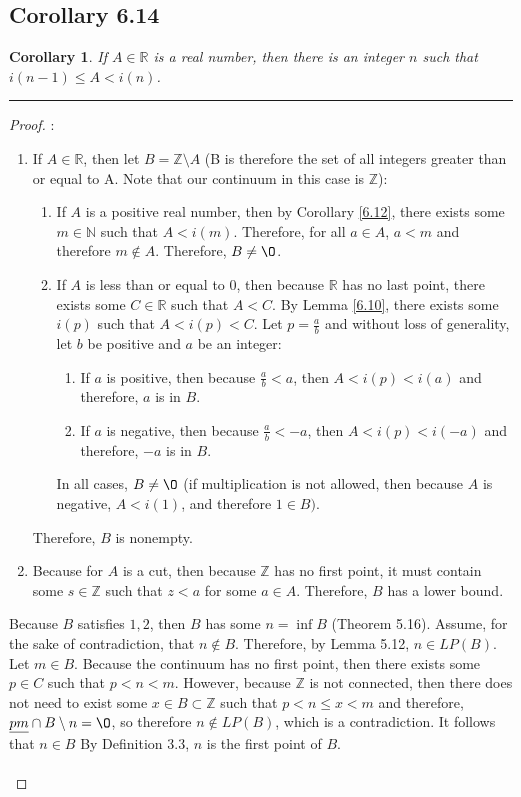 \documentclass[openany, amssymb, psamsfonts]{amsart}
\newcommand{\bbN}{\mathbb{N}}
\newcommand{\bbR}{\mathbb{R}}
\newcommand{\bbZ}{\mathbb{Z}}
\renewcommand{\emptyset}{\O}
\newcommand{\sm}{\setminus}
\newtheorem{cor}{Corollary}[section]
\theoremstyle{definition}
\numberwithin{equation}{section}
\begin{document}
\subsection*{Corollary 6.14}
\begin{cor}
\label{6.14}
If $A \in \bbR$ is a real number, then there is an integer $n$ such that $i(n-1) \leq A<i(n)$.
\end{cor}
\vspace{4pt}     \hrule   \vspace{4pt} \begin{proof}:\\
\begin{enumerate}
\item If $A\in \bbR$, then let $B= \bbZ \sm A$ (B is therefore the set of all integers greater than or equal to A. Note that our continuum in this case is $\bbZ$):
\begin{enumerate}
\item If $A$ is a positive real number, then by Corollary \ref{6.12}, there exists some $m\in \bbN$ such that $A<i(m)$. Therefore, for all $a\in A$, $a<m$ and therefore $m\notin A$. Therefore, $B\neq \emptyset$.
\item If $A$ is less than or equal to 0, then because $\bbR$ has no last point, there exists some $C\in \bbR$ such that $A<C$. By Lemma \ref{6.10}, there exists some $i(p)$ such that $A<i(p)<C$. Let $p= \frac{a}{b}$ and without loss of generality, let $b$ be positive and $a$ be an integer:
\begin{enumerate} [i]
\item If $a$ is positive, then because $\frac{a}{b}<a$, then $A<i(p)<i(a)$ and therefore, $a$ is in $B$.
\item If $a$ is negative, then because $\frac{a}{b}<-a$, then $A<i(p)<i(-a)$ and therefore, $-a$ is in $B$.
\end{enumerate}
In all cases, $B\neq \emptyset$ (if multiplication is not allowed, then because $A$ is negative, $A< i(1)$, and therefore $1\in B)$.
\end{enumerate}Therefore, $B$ is nonempty. 
\item Because for $A$ is a cut, then because $\bbZ$ has no first point, it must contain some $s\in \bbZ$ such that $z<a$ for some $a\in A$. Therefore, $B$ has a lower bound. 
\end{enumerate}
Because $B$ satisfies $1,2$, then $B$ has some $n=\inf B$ (Theorem 5.16). Assume, for the sake of contradiction, that $n \notin B$. Therefore, by Lemma 5.12, $n \in LP(B)$. Let $m\in B$. Because the continuum has no first point, then there exists some $p\in C$ such that $p<n<m$. However, because $\bbZ$ is not connected, then there does not need to exist some $x\in B \subset \bbZ$ such that $p<n\leq x<m$ and therefore, $\underline{pm}\cap B \sm n = \emptyset$, so therefore $n\notin LP (B)$, which is a contradiction. It follows that $n\in B$  By Definition 3.3, $n$ is the first point of $B$.\\\\

\end{proof}
\end{document}
